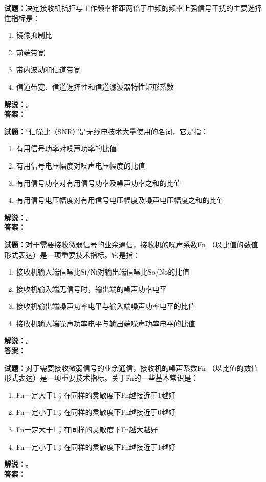 \documentclass{ctexbook}
\begin{document}
\bigskip




\noindent\textbf{试题：}决定接收机抗拒与工作频率相距两倍于中频的频率上强信号干扰的主要选择性指标是：
\begin{enumerate}[leftmargin=3em]
\item 镜像抑制比
\item 前端带宽
\item 带内波动和信道带宽
\item 信道带宽、信道选择性和信道滤波器特性矩形系数
\end{enumerate}
\noindent\textbf{解说：}\textbf{}。\\\noindent\textbf{答案：}

\bigskip




\noindent\textbf{试题：}“信噪比（SNR）”是无线电技术大量使用的名词，它是指：
\begin{enumerate}[leftmargin=3em]
\item 有用信号功率对噪声功率的比值
\item 有用信号电压幅度对噪声电压幅度的比值
\item 有用信号功率对有用信号功率及噪声功率之和的比值
\item 有用信号电压幅度对有用信号电压幅度及噪声电压幅度之和的比值
\end{enumerate}
\noindent\textbf{解说：}\textbf{}。\\\noindent\textbf{答案：}

\bigskip




\noindent\textbf{试题：}对于需要接收微弱信号的业余通信，接收机的噪声系数Fn （以比值的数值形式表达）是一项重要技术指标。它是指：
\begin{enumerate}[leftmargin=3em]
\item 接收机输入端信噪比Si/Ni对输出端信噪比So/No的比值
\item 接收机输入端无信号时，输出端的噪声功率电平
\item 接收机输出端噪声功率电平与输入端噪声功率电平的比值
\item 接收机输入端噪声功率电平与输出端噪声功率电平的比值
\end{enumerate}
\noindent\textbf{解说：}\textbf{}。\\\noindent\textbf{答案：}

\bigskip




\noindent\textbf{试题：}对于需要接收微弱信号的业余通信，接收机的噪声系数Fn （以比值的数值形式表达）是一项重要技术指标。关于Fn的一些基本常识是：
\begin{enumerate}[leftmargin=3em]
\item Fn一定大于1；在同样的灵敏度下Fn越接近于1越好
\item Fn一定小于1；在同样的灵敏度下Fn越接近于0越好
\item Fn一定大于1；在同样的灵敏度下Fn越大越好
\item Fn一定小于1；在同样的灵敏度下Fn越接近于1越好
\end{enumerate}
\noindent\textbf{解说：}\textbf{}。\\\noindent\textbf{答案：}
\end{document}
